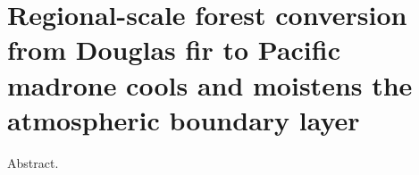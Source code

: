 \chapter{Regional-scale forest conversion from Douglas fir to Pacific madrone cools and moistens the atmospheric boundary layer}
\label{c.BL}

Abstract.







